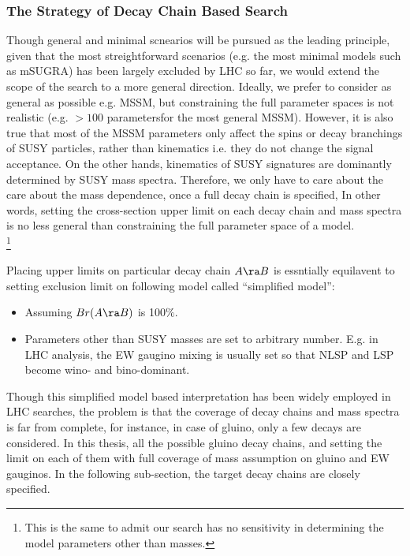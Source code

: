 \subsubsection{The Strategy of Decay Chain Based Search}
Though general and minimal scnearios will be pursued as the leading principle, 
given that the most streightforward scenarios (e.g. the most minimal models such as mSUGRA) has been largely excluded by LHC so far, we would extend the scope of the search to a more general direction.
Ideally, we prefer to consider as general as possible e.g. MSSM, but constraining the full parameter spaces is not realistic (e.g. $>100$ parametersfor the most general MSSM).
However, it is also true that most of the MSSM parameters only affect the spins or decay branchings of SUSY particles, rather than kinematics i.e. they do not change the signal acceptance. On the other hands, kinematics of SUSY signatures are dominantly determined by SUSY mass spectra. Therefore, we only have to care about the care about the mass dependence, once a full decay chain is specified, In other words, setting the cross-section upper limit on each decay chain and mass spectra is no less general than constraining the full parameter space of a model.  \\
\footnote{This is the same to admit our search has no sensitivity in determining the model parameters other than masses. }

Placing upper limits on particular decay chain $A\ra B$ is essntially equilavent to setting exclusion limit on following model called ``simplified model'':
\begin{itemize}
\item Assuming $Br(A \ra B)$ is 100$\%$.
\item Parameters other than SUSY masses are set to arbitrary number. E.g. in LHC analysis, the EW gaugino mixing is usually set so that NLSP and LSP become wino- and bino-dominant. 
\end{itemize}
Though this simplified model based interpretation has been widely employed in LHC searches, the problem is that the coverage of decay chains and mass spectra is far from complete, for instance, in case of gluino, only a few decays are considered. In this thesis, all the possible gluino decay chains, and setting the limit on each of them with full coverage of mass assumption on gluino and EW gauginos. In the following sub-section, the target decay chains are closely specified.

